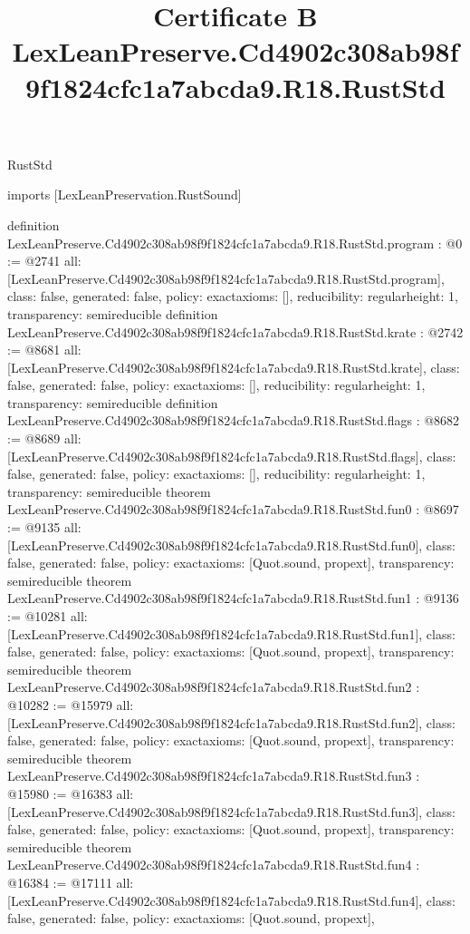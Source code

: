 \begin{lexlean}{RustStd}
\title{Certificate B LexLeanPreserve.Cd4902c308ab98f9f1824cfc1a7abcda9.R18.RustStd}
\begin{coremodule}
imports [LexLeanPreservation.RustSound]

definition LexLeanPreserve.Cd4902c308ab98f9f1824cfc1a7abcda9.R18.RustStd.program : @0 := @2741 {
  all: [LexLeanPreserve.Cd4902c308ab98f9f1824cfc1a7abcda9.R18.RustStd.program],
  class: false,
  generated: false,
  policy: exact{axioms: []},
  reducibility: regular{height: 1},
  transparency: semireducible
}
definition LexLeanPreserve.Cd4902c308ab98f9f1824cfc1a7abcda9.R18.RustStd.krate : @2742 := @8681 {
  all: [LexLeanPreserve.Cd4902c308ab98f9f1824cfc1a7abcda9.R18.RustStd.krate],
  class: false,
  generated: false,
  policy: exact{axioms: []},
  reducibility: regular{height: 1},
  transparency: semireducible
}
definition LexLeanPreserve.Cd4902c308ab98f9f1824cfc1a7abcda9.R18.RustStd.flags : @8682 := @8689 {
  all: [LexLeanPreserve.Cd4902c308ab98f9f1824cfc1a7abcda9.R18.RustStd.flags],
  class: false,
  generated: false,
  policy: exact{axioms: []},
  reducibility: regular{height: 1},
  transparency: semireducible
}
theorem LexLeanPreserve.Cd4902c308ab98f9f1824cfc1a7abcda9.R18.RustStd.fun0 : @8697 := @9135 {
  all: [LexLeanPreserve.Cd4902c308ab98f9f1824cfc1a7abcda9.R18.RustStd.fun0],
  class: false,
  generated: false,
  policy: exact{axioms: [Quot.sound, propext]},
  transparency: semireducible
}
theorem LexLeanPreserve.Cd4902c308ab98f9f1824cfc1a7abcda9.R18.RustStd.fun1 : @9136 := @10281 {
  all: [LexLeanPreserve.Cd4902c308ab98f9f1824cfc1a7abcda9.R18.RustStd.fun1],
  class: false,
  generated: false,
  policy: exact{axioms: [Quot.sound, propext]},
  transparency: semireducible
}
theorem LexLeanPreserve.Cd4902c308ab98f9f1824cfc1a7abcda9.R18.RustStd.fun2 : @10282 := @15979 {
  all: [LexLeanPreserve.Cd4902c308ab98f9f1824cfc1a7abcda9.R18.RustStd.fun2],
  class: false,
  generated: false,
  policy: exact{axioms: [Quot.sound, propext]},
  transparency: semireducible
}
theorem LexLeanPreserve.Cd4902c308ab98f9f1824cfc1a7abcda9.R18.RustStd.fun3 : @15980 := @16383 {
  all: [LexLeanPreserve.Cd4902c308ab98f9f1824cfc1a7abcda9.R18.RustStd.fun3],
  class: false,
  generated: false,
  policy: exact{axioms: [Quot.sound, propext]},
  transparency: semireducible
}
theorem LexLeanPreserve.Cd4902c308ab98f9f1824cfc1a7abcda9.R18.RustStd.fun4 : @16384 := @17111 {
  all: [LexLeanPreserve.Cd4902c308ab98f9f1824cfc1a7abcda9.R18.RustStd.fun4],
  class: false,
  generated: false,
  policy: exact{axioms: [Quot.sound, propext]},
}
\end{coremodule}
\end{lexlean}
